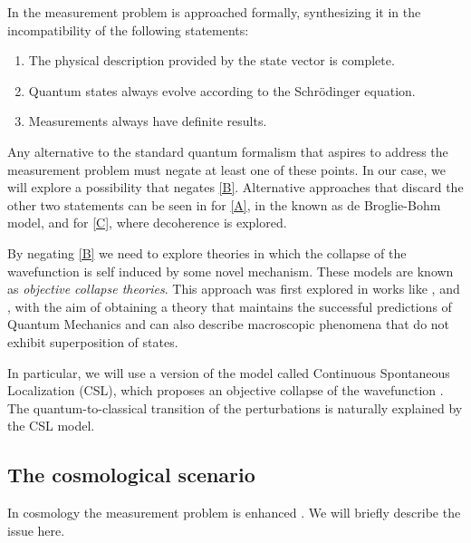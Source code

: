 \documentclass[baaa]{baaa}
\begin{document}
In \cite{Maudlin1995-MAUTMP} the measurement problem is approached formally, synthesizing it in the incompatibility of the following statements:

\begin{enumerate}
    \item The physical description provided by the state vector is complete. \label{A}
    \item Quantum states always evolve according to the Schrödinger equation. \label{B}
    \item Measurements always have definite results. \label{C}
\end{enumerate}

Any alternative to the standard quantum formalism that aspires to address the measurement problem must negate at least one of these points. In our case, we will explore a possibility that negates \ref{B}. Alternative approaches that discard the other two statements can be seen in \cite{Bell1982} for \ref{A}, in the known as de Broglie-Bohm model, and \cite{Schlosshauer2007} for \ref{C}, where decoherence is explored.

By negating \ref{B} we need to explore theories in which the collapse of the wavefunction is self induced by some novel mechanism. These models are known as \textit{objective collapse theories}. This approach was first explored in works like \cite{Pearle1976}, \cite{Diosi:1984wuz, Diosi:1986nu, Diosi:1988uy} and \cite{penrose1989book}, with the aim of obtaining a theory that maintains the successful predictions of Quantum Mechanics and can also describe macroscopic phenomena that do not exhibit superposition of states.

In particular, we will use a version of the model called Continuous Spontaneous Localization (CSL), which proposes an objective collapse of the wavefunction \citep{Pearle1976, Pearle1989}. The quantum-to-classical transition of the perturbations is naturally explained by the CSL model.

\subsection{The cosmological scenario} \label{sec2.1}

In cosmology the measurement problem is enhanced \citep{Bell1995, Hartle1993, perezsahlmansudarsky2006, Sudarsky:2009za, Landau:2011ljv, Bengochea_2020}. We will briefly describe the issue here.    
\end{document}
